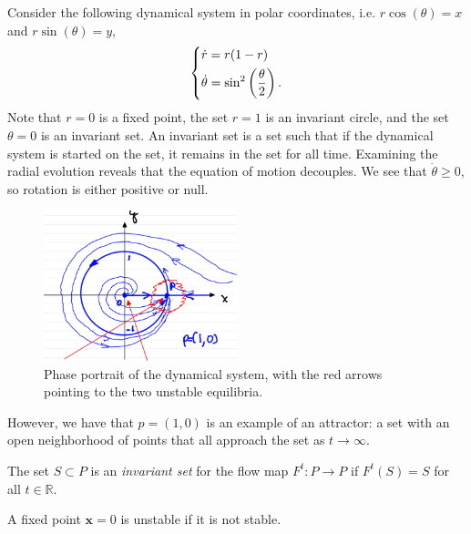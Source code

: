 \begin{ex}[]
	Consider the following dynamical system in polar coordinates, i.e. $r\cos(\theta) = x$ and $r \sin(\theta) = y$,
	\begin{align}
		\begin{dcases}
			\dot{r} = r(1-r) \\ \dot{\theta} = \sin^2\left( \frac{\theta}{2} \right).
		\end{dcases}
	\end{align}
	Note that $r=0$ is a fixed point, the set $r=1$ is an invariant circle, and the set $\theta=0$ is an invariant set. An invariant set is a set such that if the dynamical system is started on the set, it remains in the set for all time. Examining the radial evolution reveals that the equation of motion decouples. We see that $\dot{\theta}\geq 0$, so rotation is either positive or null.
	\begin{figure}[h!]
		\centering
		\includegraphics[width=0.5\textwidth]{figures/ch2/5polar_cds.png}
		\caption{Phase portrait of the dynamical system, with the red arrows pointing to the two unstable equilibria.}
	\end{figure}

	However, we have that $p=(1,0)$ is an example of an attractor: a set with an open neighborhood of points that all approach the set as $t\to \infty $.	
\end{ex}

\begin{definition}
	The set $S \subset P$ is an \emph{invariant set} for the flow map $F^{t}:P \to P$ if $F^{t}(S) =S$ for all $t \in \mathbb{R}$.
\end{definition}

\begin{definition}
	A fixed point $ \bm{x}=0$ is unstable if it is not stable.
\end{definition}

